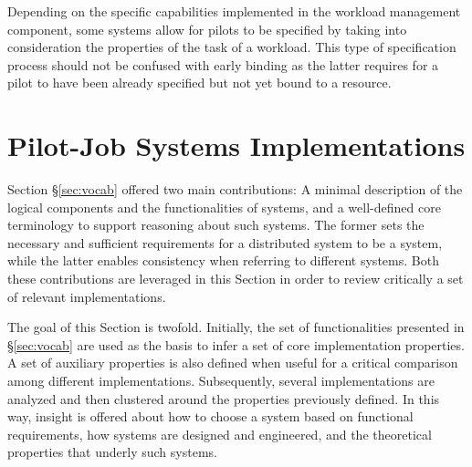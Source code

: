 \documentclass{sig-alternate}
\begin{document}
Depending on the specific capabilities implemented in the workload management
component, some \pilotjob systems allow for pilots to be specified by taking
into consideration the properties of the task of a workload. This type of
specification process should not be confused with early binding as the latter
requires for a pilot to have been already specified but not yet bound to a
resource.

\section{Pilot-Job Systems Implementations}\label{sec:4}

Section \S\ref{sec:vocab} offered two main contributions: A minimal description
of the logical components and the functionalities of \pilotjob systems, and a
well-defined core terminology to support reasoning about such systems. The
former sets the necessary and sufficient requirements for a distributed system
to be a \pilotjob system, while the latter enables consistency when referring
to different \pilotjob systems. Both these contributions are leveraged in this
Section in order to review critically a set of relevant \pilotjob
implementations.


The goal of this Section is twofold.  Initially, the set of
functionalities presented in \S\ref{sec:vocab} are used as the basis
to infer a set of core implementation properties. A set of auxiliary
properties is also defined when useful for a critical comparison among
different \pilotjob implementations. Subsequently, several \pilotjob
implementations are analyzed and then clustered around the properties
previously defined. In this way, insight is offered about how to
choose a \pilotjob system based on functional requirements, how
\pilotjob systems are designed and engineered, and the theoretical
properties that underly such systems.

\end{document}
